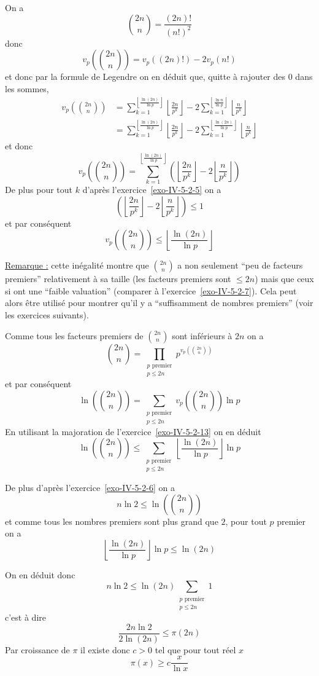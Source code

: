 \begin{sol}
On a
$$\binom{2n} n = \frac{(2n)!}{(n!)^2}$$
donc
$$v_p\left(\binom{2n} n\right) = v_p \left( (2n)!\right)-2 v_p(n!)$$
et donc par la formule de Legendre on en déduit que, quitte à rajouter des $0$ dans les sommes,
$$\begin{aligned}
    v_p\left( \binom{2n} n\right) & = \sum_{k = 1}^{\left\lfloor \frac{\ln(2n)}{\ln p} \right\rfloor} \left\lfloor \frac{2n}{p^k} \right\rfloor - 2 \sum_{k = 1}^{\left\lfloor \frac{\ln n}{\ln p} \right\rfloor}\left\lfloor \frac n{p^k} \right\rfloor  \\
    & = \sum_{k = 1}^{\left\lfloor \frac{\ln(2n)}{\ln p} \right\rfloor} \left\lfloor \frac{2n}{p^k} \right\rfloor - 2 \sum_{k = 1}^{\left\lfloor \frac{\ln(2n)}{\ln p} \right\rfloor}\left\lfloor \frac n{p^k} \right\rfloor  
\end{aligned}$$
et donc
$$\boxed{v_p\left( \binom{2n} n\right) = \sum_{k = 1}^{\left\lfloor \frac{\ln(2n)}{\ln p} \right\rfloor} \left(\left\lfloor \frac{2n}{p^k} \right\rfloor - 2 \left\lfloor \frac n{p^k} \right\rfloor  \right)}$$
De plus pour tout $k$ d'après l'exercice~\ref{exo-IV-5-2-5} on a
$$\left(\left\lfloor \frac{2n}{p^k} \right\rfloor - 2 \left\lfloor \frac n{p^k} \right\rfloor  \right) \le 1$$
et par conséquent
$$\boxed{v_p\left( \binom{2n} n\right) \le \left\lfloor \frac{\ln(2n)}{\ln p} \right\rfloor}$$

\underline{Remarque :} cette inégalité montre que $\binom{2n} n$ a non seulement ``peu de facteurs premiers'' relativement à sa taille (les facteurs premiers sont $\le 2n$) mais que ceux si ont une ``faible valuation'' (comparer à l'exercice~\ref{exo-IV-5-2-7}). Cela peut alors être utilisé pour montrer qu'il y a ``suffisamment de nombres premiers'' (voir les exercices suivants).
\end{sol}
    

\begin{sol}
Comme tous les facteurs premiers de $\binom{2n} n$ sont inférieurs à $2n$ on a
$$\binom{2n} n = \prod_{\substack{p \text{ premier} \\ p \le 2n }} p^{v_p \left( \binom{2n} n\right)}$$
et par conséquent
$$\ln \left( \binom{2n} n\right) = \sum_{\substack{p \text{ premier} \\ p \le 2n }}  v_p \left( \binom{2n} n\right)\ln p$$ 
En utilisant la majoration de l'exercice~\ref{exo-IV-5-2-13} on en déduit
$$\boxed{\ln \left( \binom{2n} n\right) \le \sum_{\substack{p \text{ premier} \\ p \le 2n }} \left\lfloor \frac{\ln(2n)}{\ln p} \right\rfloor \ln p}$$ 

De plus d'après l'exercice~\ref{exo-IV-5-2-6} on a 
$$n \ln 2 \le \ln \left( \binom{2n} n\right)$$
et comme tous les nombres premiers sont plus grand que $2$, pour tout $p$ premier on a
$$\left\lfloor \frac{\ln(2n)}{\ln p} \right\rfloor \ln p \le  \ln(2n)$$

On en déduit donc
$$n \ln 2 \le \ln(2n) \sum_{\substack{p \text{ premier} \\ p \le 2n }} 1$$
c'est à dire
$$\frac{2 n \ln 2}{2\ln(2n)} \le \pi(2n)$$
Par croissance de $\pi$ il existe donc $c > 0$ tel que pour tout réel $x$
$$\pi(x) \ge c \frac x{\ln x}$$
\end{sol}

